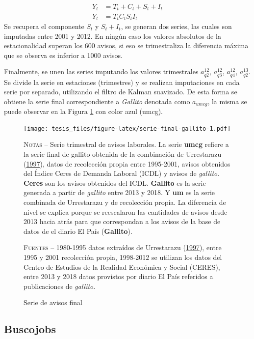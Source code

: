 \documentclass[12pt,oneside]{reedthesis}
\begin{document}
\[
\begin{aligned}
Y_t &= T_t + C_t + S_t + I_t \\
Y_t &= T_t C_t S_t I_t
\end{aligned}
\]
Se recupera el componente \(S_t\) y \(S_t + I_t\), se generan dos series, las cuales son imputadas entre 2001 y 2012. En ningún caso los valores absolutos de la estacionalidad superan los 600 avisos, si eso se trimestraliza la diferencia máxima que se observa es inferior a 1000 avisos.

Finalmente, se unen las series imputando los valores trimestrales \(a_{q2}^{12}\), \(a_{q3}^{12}\), \(a_{q4}^{12}\), \(a_{q2}^{13}\). Se divide la serie en estaciones (trimestres) y se realizan imputaciones en cada serie por separado, utilizando el filtro de Kalman suavizado. De esta forma se obtiene la serie final correspondiente a \emph{Gallito} denotada como \(a_{umcg}\), la misma se puede observar en la Figura \ref{fig:serie-final-gallito} con color azul (umcg).
\begin{figure}
\texttt{[image: tesis\_files/figure-latex/serie-final-gallito-1.pdf]}
\caption{Serie de avisos final}\label{fig:serie-final-gallito}\textsc{}

\footnotesize\textsc{Notas} -- Serie trimestral de avisos laborales. La serie \textbf{umcg} refiere a la serie final de gallito obtenida de la combinación de Urrestarazu (\protect\hyperlink{ref-Urrestarazu1997}{1997}), datos de recolección propia entre 1995-2001, avisos obtenidos del Índice Ceres de Demanda Laboral (ICDL) y avisos de \textit{gallito}. \textbf{Ceres} son los avisos obtenidos del ICDL. \textbf{Gallito} es la serie generada a partir de \textit{gallito} entre 2013 y 2018. Y \textbf{um} es la serie combinada de Urrestarazu y de recolección propia. La diferencia de nivel se explica porque se reescalaron las cantidades de avisos desde 2013 hacia atrás para que correspondan a los avisos de la base de datos de el diario El País (\textbf{Gallito}).

\textsc{Fuentes} -- 1980-1995 datos extraídos de Urrestarazu (\protect\hyperlink{ref-Urrestarazu1997}{1997}), entre 1995 y 2001 recolección propia, 1998-2012 se utilizan los datos del Centro de Estudios de la Realidad Económica y Social (CERES), entre 2013 y 2018 datos provistos por diario El País referidos a publicaciones de \textit{gallito}.
\end{figure}
\hypertarget{buscojobs}{%
\subsection{Buscojobs}\label{buscojobs}}
\end{document}
